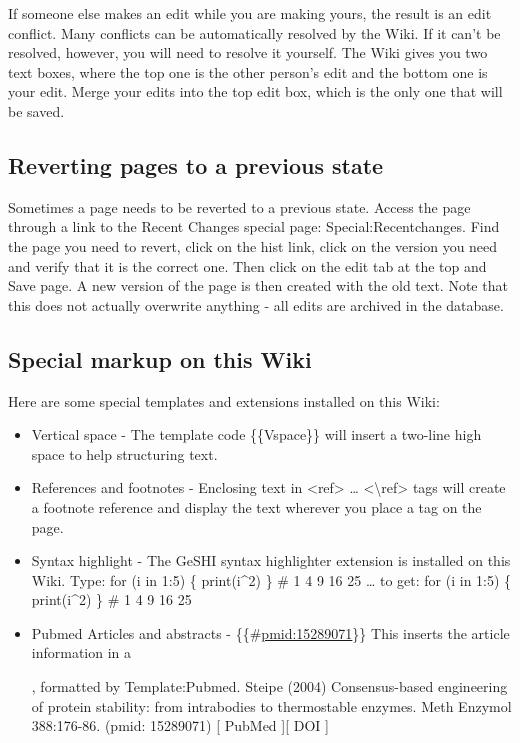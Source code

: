 \documentclass[]{book}
\begin{document}
If someone else makes an edit while you are making yours, the result is
an edit conflict. Many conflicts can be automatically resolved by the
Wiki. If it can't be resolved, however, you will need to resolve it
yourself. The Wiki gives you two text boxes, where the top one is the
other person's edit and the bottom one is your edit. Merge your edits
into the top edit box, which is the only one that will be saved.

\subsection{Reverting pages to a previous
state}\label{reverting-pages-to-a-previous-state}

Sometimes a page needs to be reverted to a previous state. Access the
page through a link to the Recent Changes special page:
Special:Recentchanges. Find the page you need to revert, click on the
hist link, click on the version you need and verify that it is the
correct one. Then click on the edit tab at the top and Save page. A new
version of the page is then created with the old text. Note that this
does not actually overwrite anything - all edits are archived in the
database.

\subsection{Special markup on this
Wiki}\label{special-markup-on-this-wiki}

Here are some special templates and extensions installed on this Wiki:

\begin{itemize}
\item
  Vertical space - The template code \{\{Vspace\}\} will insert a
  two-line high space to help structuring text.
\item
  References and footnotes - Enclosing text in
  \textless{}ref\textgreater{} \ldots{}
  \textless{}\textbackslash{}ref\textgreater{} tags will create a
  footnote reference and display the text wherever you place a tag on
  the page.
\item
  Syntax highlight - The GeSHI syntax highlighter extension is installed
  on this Wiki. Type: for (i in 1:5) \{ print(i\^{}2) \} \# 1 4 9 16 25
  \ldots{} to get: for (i in 1:5) \{ print(i\^{}2) \} \# 1 4 9 16 25
\item
  Pubmed Articles and abstracts - \{\{\#\url{pmid:15289071}\}\} This
  inserts the article information in a

  , formatted by Template:Pubmed. Steipe (2004) Consensus-based
  engineering of protein stability: from intrabodies to thermostable
  enzymes. Meth Enzymol 388:176-86. (pmid: 15289071) {[} PubMed {]}{[}
  DOI {]}
\end{itemize}
\end{document}
